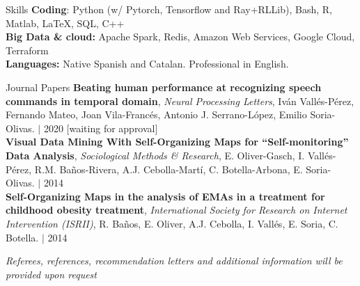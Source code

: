 \documentclass{resume} %
\begin{document}


\begin{rSection}{Skills} \itemsep -3pt  
{\textbf{Coding}: Python (w/ Pytorch, Tensorflow and Ray+RLLib), Bash, R, Matlab, \LaTeX, SQL, C++}  \\
{\textbf{Big Data \& cloud:} Apache Spark, Redis, Amazon Web Services, Google Cloud, Terraform} \\
{\textbf{Languages:} Native Spanish and Catalan. Professional in English.}
\end{rSection}  
 


\begin{rSection}{Journal Papers}
{\textbf{Beating human performance at recognizing speech commands in temporal domain}, \textit{Neural Processing Letters}, Iván Vallés-Pérez, Fernando Mateo, Joan Vila-Francés, Antonio J. Serrano-López, Emilio Soria-Olivas. $|$  {2020} [waiting for approval]}\\
{\textbf{Visual Data Mining With Self-Organizing Maps for ``Self-monitoring'' Data Analysis}, \textit{Sociological Methods \& Research}, E. Oliver-Gasch, I. Vallés-Pérez, R.M. Baños-Rivera, A.J. Cebolla-Martí, C. Botella-Arbona, E. Soria-Olivas. $|$  {2014}}\\
{\textbf{Self-Organizing Maps in the analysis of EMAs in a treatment for childhood obesity treatment}, \textit{International Society for Research on Internet Intervention (ISRII)}, R. Baños, E. Oliver, A.J. Cebolla, I. Vallés, E. Soria, C. Botella.  $|$  {2014}}

\end{rSection}

\vspace{\fill}
\begin{flushright}
	\small{\textit{Referees, references, recommendation letters and additional information will be provided upon request}}
\end{flushright}
\end{document}
